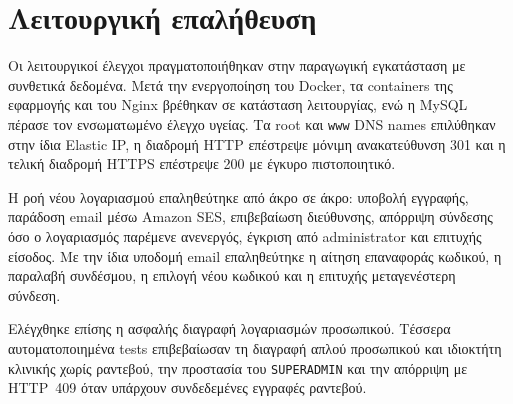 \section{Λειτουργική επαλήθευση}
Οι λειτουργικοί έλεγχοι πραγματοποιήθηκαν στην παραγωγική εγκατάσταση με
συνθετικά δεδομένα. Μετά την ενεργοποίηση του Docker, τα containers της
εφαρμογής και του Nginx βρέθηκαν σε κατάσταση λειτουργίας, ενώ η MySQL πέρασε
τον ενσωματωμένο έλεγχο υγείας. Τα root και \texttt{www} DNS names επιλύθηκαν
στην ίδια Elastic IP, η διαδρομή HTTP επέστρεψε μόνιμη ανακατεύθυνση 301 και
η τελική διαδρομή HTTPS επέστρεψε 200 με έγκυρο πιστοποιητικό.

Η ροή νέου λογαριασμού επαληθεύτηκε από άκρο σε άκρο: υποβολή εγγραφής,
παράδοση email μέσω Amazon SES, επιβεβαίωση διεύθυνσης, απόρριψη σύνδεσης όσο
ο λογαριασμός παρέμενε ανενεργός, έγκριση από administrator και επιτυχής
είσοδος. Με την ίδια υποδομή email επαληθεύτηκε η αίτηση επαναφοράς κωδικού,
η παραλαβή συνδέσμου, η επιλογή νέου κωδικού και η επιτυχής μεταγενέστερη
σύνδεση.

Ελέγχθηκε επίσης η ασφαλής διαγραφή λογαριασμών προσωπικού. Τέσσερα
αυτοματοποιημένα tests επιβεβαίωσαν τη διαγραφή απλού προσωπικού και ιδιοκτήτη
κλινικής χωρίς ραντεβού, την προστασία του \texttt{SUPERADMIN} και την
απόρριψη με HTTP~409 όταν υπάρχουν συνδεδεμένες εγγραφές ραντεβού.


